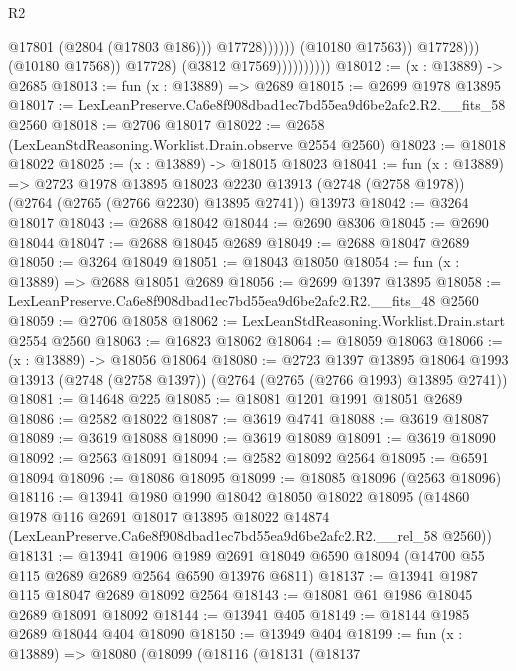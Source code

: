 \begin{lexlean}{R2}
\begin{coremodule}
                                                @17801
                                                (@2804 (@17803 @186)))
                                              @17728))))))
                                  (@10180 @17563))
                                @17728)))
                          (@10180 @17568))
                        @17728)
                      (@3812 @17569))))))))))
@18012 := (x : @13889) -> @2685
@18013 := fun (x : @13889) => @2689
@18015 := @2699 @1978 @13895
@18017 := LexLeanPreserve.Ca6e8f908dbad1ec7bd55ea9d6be2afc2.R2.__fits_58 @2560
@18018 := @2706 @18017
@18022 := @2658 (LexLeanStdReasoning.Worklist.Drain.observe @2554 @2560)
@18023 := @18018 @18022
@18025 := (x : @13889) -> @18015 @18023
@18041 := fun (x : @13889) =>
  @2723
    @1978
    @13895
    @18023
    @2230
    @13913
    (@2748 (@2758 @1978))
    (@2764 (@2765 (@2766 @2230) @13895 @2741))
    @13973
@18042 := @3264 @18017
@18043 := @2688 @18042
@18044 := @2690 @8306
@18045 := @2690 @18044
@18047 := @2688 @18045 @2689
@18049 := @2688 @18047 @2689
@18050 := @3264 @18049
@18051 := @18043 @18050
@18054 := fun (x : @13889) => @2688 @18051 @2689
@18056 := @2699 @1397 @13895
@18058 := LexLeanPreserve.Ca6e8f908dbad1ec7bd55ea9d6be2afc2.R2.__fits_48 @2560
@18059 := @2706 @18058
@18062 := LexLeanStdReasoning.Worklist.Drain.start @2554 @2560
@18063 := @16823 @18062
@18064 := @18059 @18063
@18066 := (x : @13889) -> @18056 @18064
@18080 := @2723
    @1397
    @13895
    @18064
    @1993
    @13913
    (@2748 (@2758 @1397))
    (@2764 (@2765 (@2766 @1993) @13895 @2741))
@18081 := @14648 @225
@18085 := @18081 @1201 @1991 @18051 @2689
@18086 := @2582 @18022
@18087 := @3619 @4741
@18088 := @3619 @18087
@18089 := @3619 @18088
@18090 := @3619 @18089
@18091 := @3619 @18090
@18092 := @2563 @18091
@18094 := @2582 @18092 @2564
@18095 := @6591 @18094
@18096 := @18086 @18095
@18099 := @18085 @18096 (@2563 @18096)
@18116 := @13941
    @1980
    @1990
    @18042
    @18050
    @18022
    @18095
    (@14860
      @1978
      @116
      @2691
      @18017
      @13895
      @18022
      @14874
      (LexLeanPreserve.Ca6e8f908dbad1ec7bd55ea9d6be2afc2.R2.__rel_58 @2560))
@18131 := @13941
    @1906
    @1989
    @2691
    @18049
    @6590
    @18094
    (@14700 @55 @115 @2689 @2689 @2564 @6590 @13976 @6811)
@18137 := @13941 @1987 @115 @18047 @2689 @18092 @2564
@18143 := @18081 @61 @1986 @18045 @2689 @18091 @18092
@18144 := @13941 @405
@18149 := @18144 @1985 @2689 @18044 @404 @18090
@18150 := @13949 @404
@18199 := fun (x : @13889) =>
  @18080
    (@18099
      (@18116
        (@18131
          (@18137

\end{coremodule}
\end{lexlean}
